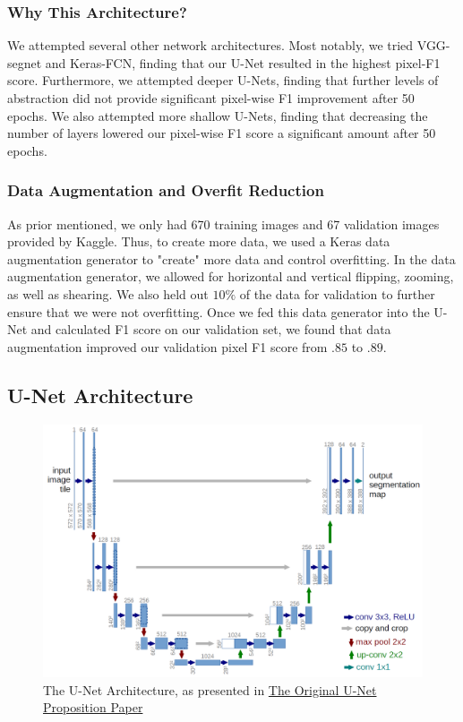 \documentclass[paper=letter, fontsize=12pt]{article}
\numberwithin{equation}{section} %
\numberwithin{figure}{section} %
\numberwithin{table}{section} %
\begin{document}
\subsubsection{Why This Architecture?}
We attempted several other network architectures. Most notably, we tried
VGG-segnet and Keras-FCN, finding that our U-Net resulted in the highest
pixel-F1 score. Furthermore, we attempted deeper U-Nets, finding that further
levels of abstraction did not provide significant pixel-wise F1 improvement
after 50 epochs. We also attempted more shallow U-Nets, finding that
decreasing the number of layers lowered our pixel-wise F1 score a significant
amount after 50 epochs.

\subsubsection{ Data Augmentation and Overfit Reduction }
As prior mentioned, we only had 670 training images and 67 validation images provided by Kaggle.
Thus, to create more data, we used a Keras data augmentation generator to "create" more data
and control overfitting. In the data augmentation generator, we allowed for horizontal and
vertical flipping, zooming, as well as shearing. We also held out $10\%$ of the data for validation
to further ensure that we were not overfitting. Once we fed this data generator into the U-Net and
calculated F1 score on our validation set, we found that data augmentation improved our validation
pixel F1 score from $.85$ to $.89$.

\begin{appendixatend}
    \subsection{U-Net Architecture}
    \begin{figure}
        \centering
        \includegraphics[width=\textwidth]{./figs/unet_architecture.png}
        \caption{The U-Net Architecture, as presented in  \href{https://arxiv.org/pdf/1505.04597.pdf}{The Original U-Net Proposition Paper} }
        \label{fig:U-Net-architecture}
    \end{figure}
\end{appendixatend}
\end{document}
